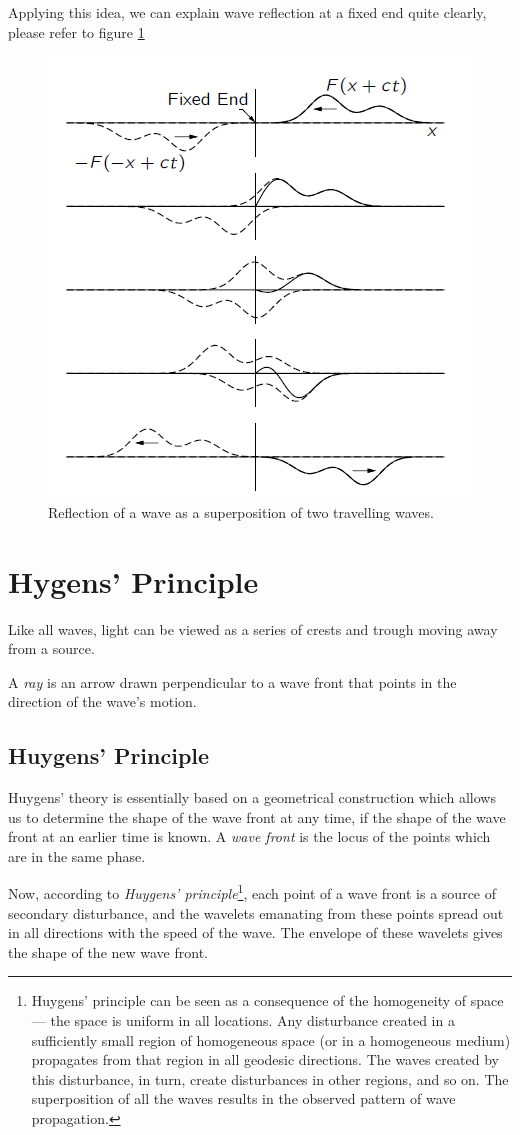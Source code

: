 \documentclass[openany]{book}
\begin{document}
Applying this idea, we can explain wave reflection at a fixed end quite clearly, please refer to figure \ref{fig:6}
\begin{figure}[H]
\centering
\includegraphics[scale=1]{Figure/6.PNG}
\caption{Reflection of a wave as a superposition of two travelling waves.}
\label{fig:6}
\end{figure}
\section{Hygens' Principle}
Like all waves, light can be viewed as a series of crests and trough moving away from a source.

A \emph{ray} is an arrow drawn perpendicular to a wave front that points in the direction of the wave’s motion.
\subsection{Huygens' Principle}
Huygens' theory is essentially based on a geometrical construction which allows us to determine the shape of the wave front at any time, if the shape of the wave front at an earlier time is known. A \emph{wave front} is the locus of the points which are in the same phase.

Now, according to \emph{Huygens' principle}\footnote{Huygens' principle can be seen as a consequence of the homogeneity of space — the space is uniform in all locations. Any disturbance created in a sufficiently small region of homogeneous space (or in a homogeneous medium) propagates from that region in all geodesic directions. The waves created by this disturbance, in turn, create disturbances in other regions, and so on. The superposition of all the waves results in the observed pattern of wave propagation.}, each point of a wave front is a source of secondary disturbance, and the wavelets emanating from these points spread out in all directions with the speed of the wave. The envelope of these wavelets gives the shape of the new wave front.
\end{document}
